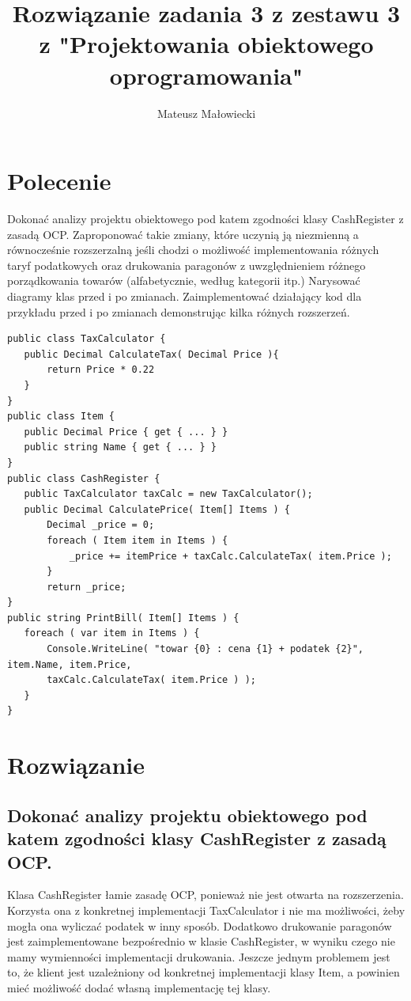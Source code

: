\documentclass[10pt, a4paper]{article}
\title{Rozwiązanie zadania 3 z zestawu 3 z "Projektowania obiektowego oprogramowania"}
\author{Mateusz Małowiecki}
\begin{document}
\maketitle
\section*{Polecenie}
Dokonać analizy projektu obiektowego pod katem zgodności klasy CashRegister z zasadą OCP. Zaproponować takie zmiany, które uczynią ją
niezmienną a równocześnie rozszerzalną jeśli chodzi o możliwość implementowania różnych
taryf podatkowych oraz drukowania paragonów z uwzględnieniem różnego porządkowania
towarów (alfabetycznie, według kategorii itp.)
Narysować diagramy klas przed i po zmianach. Zaimplementować działający kod dla przykładu przed i po zmianach demonstrując kilka różnych rozszerzeń.
\begin{verbatim}
public class TaxCalculator {
   public Decimal CalculateTax( Decimal Price ){
       return Price * 0.22 
   }
}
public class Item {
   public Decimal Price { get { ... } }
   public string Name { get { ... } }
}
public class CashRegister {
   public TaxCalculator taxCalc = new TaxCalculator();
   public Decimal CalculatePrice( Item[] Items ) {
       Decimal _price = 0;
       foreach ( Item item in Items ) {
           _price += itemPrice + taxCalc.CalculateTax( item.Price );
       }
       return _price;
}
public string PrintBill( Item[] Items ) {
   foreach ( var item in Items ) {
       Console.WriteLine( "towar {0} : cena {1} + podatek {2}", item.Name, item.Price, 
       taxCalc.CalculateTax( item.Price ) );
   }
}
\end{verbatim}
\section*{Rozwiązanie}
\subsection*{Dokonać analizy projektu obiektowego pod katem zgodności klasy CashRegister z zasadą OCP.}
Klasa CashRegister łamie zasadę OCP, ponieważ nie jest otwarta na rozszerzenia. Korzysta ona z konkretnej implementacji TaxCalculator i nie ma możliwości, żeby mogła ona wyliczać podatek w inny sposób. Dodatkowo drukowanie paragonów jest zaimplementowane bezpośrednio w klasie CashRegister, w wyniku czego nie mamy wymienności implementacji drukowania. Jeszcze jednym problemem jest to, że klient jest uzależniony od konkretnej implementacji klasy Item, a powinien mieć możliwość dodać własną implementację tej klasy.
\end{document}
